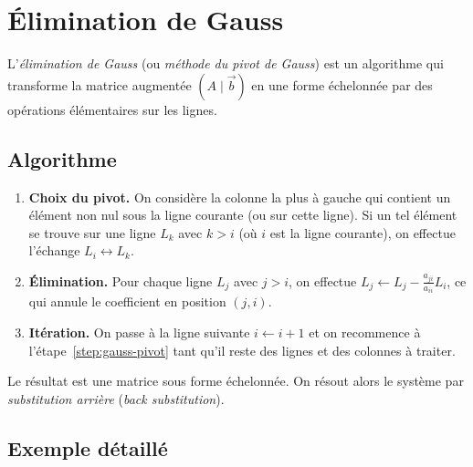 \section{Élimination de Gauss}\label{sec:gauss}

L'\emph{élimination de Gauss} (ou
\emph{méthode du pivot de Gauss}) est un algorithme
qui transforme la matrice augmentée $(A\mid\vec{b})$ en une forme
échelonnée par des opérations élémentaires sur les lignes.

\subsection{Algorithme}\label{subsec:algo-gauss}

\begin{enumerate}[label=\textbf{Étape \arabic*.},leftmargin=*]
  \item\label{step:gauss-pivot} \textbf{Choix du pivot.} On considère la
    colonne la plus à gauche qui contient un élément non nul sous la ligne
    courante (ou sur cette ligne). Si un tel élément se trouve sur une ligne
    $L_k$ avec $k>i$ (où $i$ est la ligne courante), on effectue l'échange
    $L_i\leftrightarrow L_k$.
  \item\label{step:gauss-elim} \textbf{Élimination.} Pour chaque ligne
    $L_j$ avec $j>i$, on effectue
    $L_j\leftarrow L_j - \frac{a_{ji}}{a_{ii}}L_i$,
    ce qui annule le coefficient en position $(j,i)$.
  \item\label{step:gauss-iter} \textbf{Itération.} On passe à la ligne
    suivante $i\leftarrow i+1$ et on recommence à l'étape~\ref{step:gauss-pivot}
    tant qu'il reste des lignes et des colonnes à traiter.
\end{enumerate}

Le résultat est une matrice sous forme échelonnée. On résout alors le
système par \emph{substitution arrière}
(\emph{back substitution}).

\subsection{Exemple détaillé}\label{subsec:ex-gauss}

